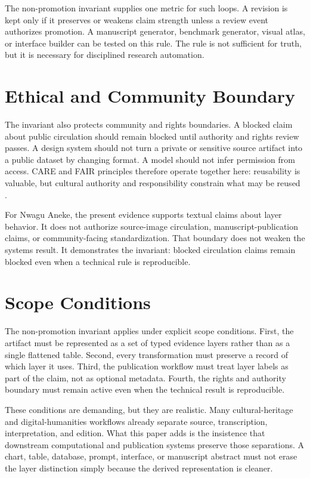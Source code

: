 \documentclass[sigconf,nonacm]{acmart}
\begin{document}
The non-promotion invariant supplies one metric for such loops. A revision is
kept only if it preserves or weakens claim strength unless a review event
authorizes promotion. A manuscript generator, benchmark generator, visual atlas,
or interface builder can be tested on this rule. The rule is not sufficient for
truth, but it is necessary for disciplined research automation.

\section{Ethical and Community Boundary}
The invariant also protects community and rights boundaries. A blocked claim
about public circulation should remain blocked until authority and rights review
passes. A design system should not turn a private or sensitive source artifact
into a public dataset by changing format. A model should not infer permission
from access. CARE and FAIR principles therefore operate together here:
reusability is valuable, but cultural authority and responsibility constrain
what may be reused \cite{wilkinson2016fair,carroll2020care}.

For Nwagu Aneke, the present evidence supports textual claims about layer
behavior. It does not authorize source-image circulation, manuscript-publication
claims, or community-facing standardization. That boundary does not weaken the
systems result. It demonstrates the invariant: blocked circulation claims remain
blocked even when a technical rule is reproducible.



\section{Scope Conditions}
The non-promotion invariant applies under explicit scope conditions. First, the artifact must be
represented as a set of typed evidence layers rather than as a single flattened
table. Second, every transformation must preserve a record of which layer it
uses. Third, the publication workflow must treat layer labels as part of the
claim, not as optional metadata. Fourth, the rights and authority boundary must
remain active even when the technical result is reproducible.

These conditions are demanding, but they are realistic. Many cultural-heritage
and digital-humanities workflows already separate source, transcription,
interpretation, and edition. What this paper adds is the insistence that
downstream computational and publication systems preserve those separations. A
chart, table, database, prompt, interface, or manuscript abstract must not erase
the layer distinction simply because the derived representation is cleaner.
\end{document}
